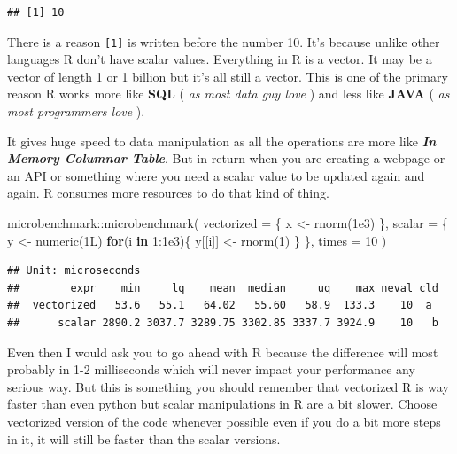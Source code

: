 \documentclass[
]{book}
\newenvironment{Shaded}{\begin{snugshade}}{\end{snugshade}}
\newcommand{\AttributeTok}[1]{\textcolor[rgb]{0.77,0.63,0.00}{#1}}
\newcommand{\ControlFlowTok}[1]{\textcolor[rgb]{0.13,0.29,0.53}{\textbf{#1}}}
\newcommand{\DecValTok}[1]{\textcolor[rgb]{0.00,0.00,0.81}{#1}}
\newcommand{\FloatTok}[1]{\textcolor[rgb]{0.00,0.00,0.81}{#1}}
\newcommand{\FunctionTok}[1]{\textcolor[rgb]{0.00,0.00,0.00}{#1}}
\newcommand{\NormalTok}[1]{#1}
\newcommand{\OtherTok}[1]{\textcolor[rgb]{0.56,0.35,0.01}{#1}}
\newcommand{\SpecialCharTok}[1]{\textcolor[rgb]{0.00,0.00,0.00}{#1}}
\begin{document}
\begin{verbatim}
## [1] 10
\end{verbatim}

There is a reason \texttt{{[}1{]}} is written before the number 10. It's because unlike other languages R don't have scalar values. Everything in R is a vector. It may be a vector of length 1 or 1 billion but it's all still a vector. This is one of the primary reason R works more like \textbf{SQL} ( \emph{as most data guy love} ) and less like \textbf{JAVA} ( \emph{as most programmers love} ).

It gives huge speed to data manipulation as all the operations are more like \textbf{\emph{In Memory Columnar Table}}. But in return when you are creating a webpage or an API or something where you need a scalar value to be updated again and again. R consumes more resources to do that kind of thing.

\begin{Shaded}
\begin{Highlighting}[]
\NormalTok{microbenchmark}\SpecialCharTok{::}\FunctionTok{microbenchmark}\NormalTok{(}
\AttributeTok{vectorized =}\NormalTok{ \{}
\NormalTok{  x }\OtherTok{\textless{}{-}} \FunctionTok{rnorm}\NormalTok{(}\FloatTok{1e3}\NormalTok{)}
\NormalTok{\},}
\AttributeTok{scalar =}\NormalTok{ \{}
\NormalTok{  y }\OtherTok{\textless{}{-}} \FunctionTok{numeric}\NormalTok{(1L)}
  \ControlFlowTok{for}\NormalTok{(i }\ControlFlowTok{in} \DecValTok{1}\SpecialCharTok{:}\FloatTok{1e3}\NormalTok{)\{}
\NormalTok{  y[[i]] }\OtherTok{\textless{}{-}} \FunctionTok{rnorm}\NormalTok{(}\DecValTok{1}\NormalTok{)}
\NormalTok{  \}}
\NormalTok{\},}
\AttributeTok{times =} \DecValTok{10}
\NormalTok{)}
\end{Highlighting}
\end{Shaded}

\begin{verbatim}
## Unit: microseconds
##        expr    min     lq    mean  median     uq    max neval cld
##  vectorized   53.6   55.1   64.02   55.60   58.9  133.3    10  a 
##      scalar 2890.2 3037.7 3289.75 3302.85 3337.7 3924.9    10   b
\end{verbatim}

Even then I would ask you to go ahead with R because the difference will most probably in 1-2 milliseconds which will never impact your performance any serious way. But this is something you should remember that vectorized R is way faster than even python but scalar manipulations in R are a bit slower. Choose vectorized version of the code whenever possible even if you do a bit more steps in it, it will still be faster than the scalar versions.
\end{document}
